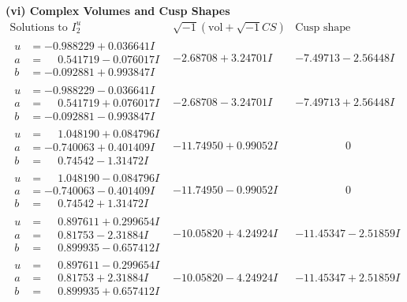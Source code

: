 \documentclass[1p]{elsarticle_modified}
\theoremstyle{definition}
\newcommand{\I}{\sqrt{-1}}
\begin{document}
\newpage\flushleft \textbf{(vi) Complex Volumes and Cusp Shapes}
$$\begin{array}{c|c|c}  
\text{Solutions to }I^u_{2}& \I (\text{vol} + \sqrt{-1}CS) & \text{Cusp shape}\\
 \hline 
\begin{aligned}
u &= -0.988229 + 0.036641 I \\
a &= \phantom{-}0.541719 - 0.076017 I \\
b &= -0.092881 + 0.993847 I\end{aligned}
 & -2.68708 + 3.24701 I & -7.49713 - 2.56448 I \\ \hline\begin{aligned}
u &= -0.988229 - 0.036641 I \\
a &= \phantom{-}0.541719 + 0.076017 I \\
b &= -0.092881 - 0.993847 I\end{aligned}
 & -2.68708 - 3.24701 I & -7.49713 + 2.56448 I \\ \hline\begin{aligned}
u &= \phantom{-}1.048190 + 0.084796 I \\
a &= -0.740063 + 0.401409 I \\
b &= \phantom{-}0.74542 - 1.31472 I\end{aligned}
 & -11.74950 + 0.99052 I & \phantom{-0.000000 } 0 \\ \hline\begin{aligned}
u &= \phantom{-}1.048190 - 0.084796 I \\
a &= -0.740063 - 0.401409 I \\
b &= \phantom{-}0.74542 + 1.31472 I\end{aligned}
 & -11.74950 - 0.99052 I & \phantom{-0.000000 } 0 \\ \hline\begin{aligned}
u &= \phantom{-}0.897611 + 0.299654 I \\
a &= \phantom{-}0.81753 - 2.31884 I \\
b &= \phantom{-}0.899935 - 0.657412 I\end{aligned}
 & -10.05820 + 4.24924 I & -11.45347 - 2.51859 I \\ \hline\begin{aligned}
u &= \phantom{-}0.897611 - 0.299654 I \\
a &= \phantom{-}0.81753 + 2.31884 I \\
b &= \phantom{-}0.899935 + 0.657412 I\end{aligned}
 & -10.05820 - 4.24924 I & -11.45347 + 2.51859 I \\ \hline\begin{aligned}

\end{aligned}
\end{array}$$
\end{document}

